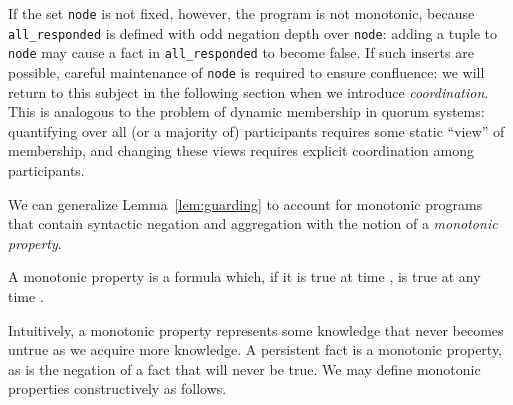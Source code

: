 If the set \texttt{node} is not fixed, however, the program is not monotonic, because 
\texttt{all\_responded} is defined with odd negation depth over \texttt{node}: adding a tuple
to \texttt{node} may cause a fact in \texttt{all\_responded} to become false.  If such inserts
are possible, careful maintenance of \texttt{node} is required to ensure confluence: we will
return to this subject in the following section when we introduce {\em coordination}.
This is analogous to
the problem of dynamic membership in quorum systems: quantifying over all (or a majority
of) participants requires some static ``view'' of membership, and changing these views requires
explicit coordination among participants.



We can generalize Lemma~\ref{lem:guarding} to account for monotonic programs that 
contain syntactic negation and aggregation with
the notion of a {\em monotonic property}.




\begin{definition}
A monotonic property is a formula which, if it is true at time ,  is true at any time .
\end{definition}

Intuitively, a monotonic property represents some knowledge that never becomes untrue as we acquire  more knowledge.  A persistent fact is a monotonic property, as is the negation of a
fact that will never be true.  We may define monotonic properties constructively as follows. 


